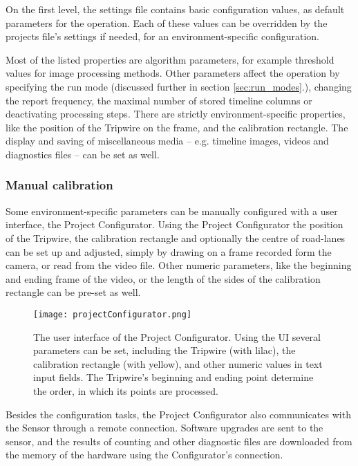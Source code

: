 On the first level, the settings file contains basic configuration values, as default parameters for the operation.
Each of these values can be overridden by the projects file's settings if needed, for an environment-specific configuration.

Most of the listed properties are algorithm parameters, for example threshold values for image processing methods.
Other parameters affect the operation by specifying the run mode (discussed further in section \ref{sec:run_modes}.), changing the report frequency, the maximal number of stored timeline columns or deactivating processing steps.
There are strictly environment-specific properties, like the position of the Tripwire on the frame, and the calibration rectangle.
The display and saving of miscellaneous media -- e.g. timeline images, videos and diagnostics files -- can be set as well.

\subsubsection{Manual calibration}
Some environment-specific parameters can be manually configured with a user interface, the Project Configurator.
Using the Project Configurator the position of the Tripwire, the calibration rectangle and optionally the centre of road-lanes can be set up and adjusted, simply by drawing on a frame recorded form the camera, or read from the video file.
Other numeric parameters, like the beginning and ending frame of the video, or the length of the sides of the calibration rectangle can be pre-set as well.

\begin{figure}[!h]
	\centering
	\texttt{[image: projectConfigurator.png]}
	\caption{The user interface of the Project Configurator. Using the UI several parameters can be set, including the Tripwire (with lilac), the calibration rectangle (with yellow), and other numeric values in text input fields. The Tripwire's beginning and ending point determine the order, in which its points are processed. \label{fig:project_configurator}}
\end{figure}

Besides the configuration tasks, the Project Configurator also communicates with the Sensor through a remote connection.
Software upgrades are sent to the sensor, and the results of counting and other diagnostic files are downloaded from the memory of the hardware using the Configurator's connection.
